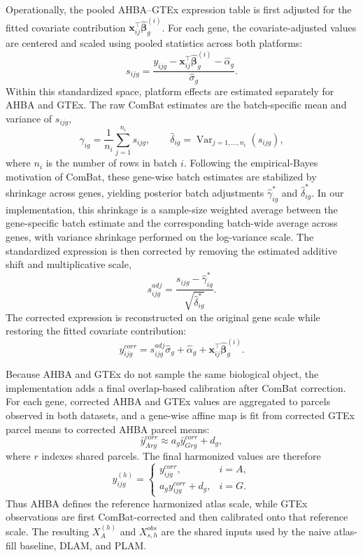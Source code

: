\documentclass[11pt]{article}
\numberwithin{equation}{section}
\begin{document}
Operationally, the pooled AHBA--GTEx expression table is first adjusted for the
fitted covariate contribution $\mathbf{x}_{ij}^{\top}\hat{\boldsymbol{\beta}}_g^{(i)}$.
For each gene, the covariate-adjusted values are centered and scaled using pooled
statistics across both platforms:
\[
  s_{ijg}
  =
  \frac{
    y_{ijg}
    -
    \mathbf{x}_{ij}^{\top}\hat{\boldsymbol{\beta}}_g^{(i)}
    -
    \hat{\alpha}_g
  }{\hat{\sigma}_g}.
\]
Within this standardized space, platform effects are estimated separately for AHBA
and GTEx.  The raw ComBat estimates are the batch-specific mean and variance of
$s_{ijg}$,
\[
  \hat{\gamma}_{ig}
  =
  \frac{1}{n_i}\sum_{j=1}^{n_i} s_{ijg},
  \qquad
  \hat{\delta}_{ig}
  =
  \operatorname{Var}_{j=1,\ldots,n_i}(s_{ijg}),
\]
where $n_i$ is the number of rows in batch $i$.  Following the empirical-Bayes
motivation of ComBat, these gene-wise batch estimates are stabilized by shrinkage
across genes, yielding posterior batch adjustments $\hat{\gamma}^{*}_{ig}$ and
$\hat{\delta}^{*}_{ig}$.  In our implementation, this shrinkage is a sample-size
weighted average between the gene-specific batch estimate and the corresponding
batch-wide average across genes, with variance shrinkage performed on the
log-variance scale.  The standardized expression is then corrected by removing the
estimated additive shift and multiplicative scale,
\[
  s^{adj}_{ijg}
  =
  \frac{s_{ijg}-\hat{\gamma}^{*}_{ig}}
       {\sqrt{\hat{\delta}^{*}_{ig}}}.
\]
The corrected expression is reconstructed on the original gene scale while restoring
the fitted covariate contribution:
\[
  y^{corr}_{ijg}
  =
  s^{adj}_{ijg}\hat{\sigma}_g
  +
  \hat{\alpha}_g
  +
  \mathbf{x}_{ij}^{\top}\hat{\boldsymbol{\beta}}_g^{(i)} .
\]

Because AHBA and GTEx do not sample the same biological object, the implementation
adds a final overlap-based calibration after ComBat correction.  For each gene,
corrected AHBA and GTEx values are aggregated to parcels observed in both datasets,
and a gene-wise affine map is fit from corrected GTEx parcel means to corrected AHBA
parcel means:
\[
  \bar{y}^{corr}_{A rg}
  \approx
  a_g \bar{y}^{corr}_{G rg} + d_g ,
\]
where $r$ indexes shared parcels.  The final harmonized values are therefore
\[
  y^{(h)}_{ijg}
  =
  \begin{cases}
    y^{corr}_{ijg}, & i=A,\\
    a_g y^{corr}_{ijg} + d_g, & i=G.
  \end{cases}
\]
Thus AHBA defines the reference harmonized atlas scale, while GTEx observations are
first ComBat-corrected and then calibrated onto that reference scale.  The resulting
$X_A^{(h)}$ and $X_{s,h}^{obs}$ are the shared inputs used by the naive atlas-fill
baseline, DLAM, and PLAM.
\end{document}
